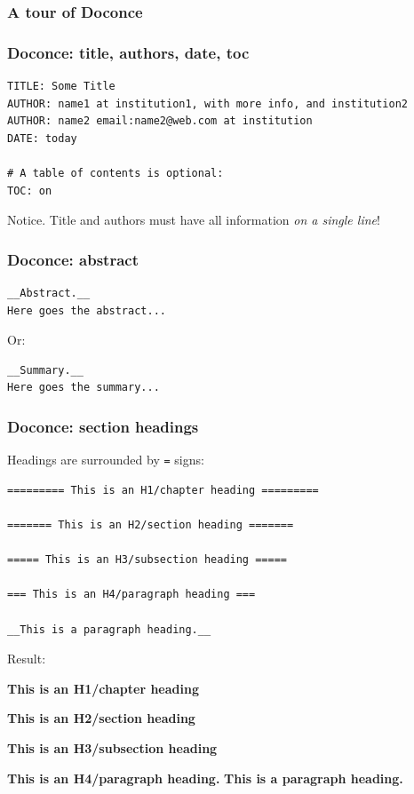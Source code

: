 \documentclass{beamer}
\newenvironment{graybox1admon}[1][]{\begin{block}{#1}}{\end{block}}
\begin{document}
\begin{frame}
\frametitle{A tour of Doconce}

\end{frame}

\begin{frame}
\frametitle{Doconce: title, authors, date, toc}

\begin{Verbatim}[numbers=none,fontsize=\fontsize{9pt}{9pt},baselinestretch=0.95]
TITLE: Some Title
AUTHOR: name1 at institution1, with more info, and institution2
AUTHOR: name2 email:name2@web.com at institution
DATE: today

# A table of contents is optional:
TOC: on
\end{Verbatim}


\begin{graybox1admon}[Notice.]
Title and authors must have all information \emph{on a single line}!
\end{graybox1admon}
\end{frame}

\begin{frame}
\frametitle{Doconce: abstract}

\begin{Verbatim}[numbers=none,fontsize=\fontsize{9pt}{9pt},baselinestretch=0.95]
__Abstract.__
Here goes the abstract...
\end{Verbatim}

Or:
\begin{Verbatim}[numbers=none,fontsize=\fontsize{9pt}{9pt},baselinestretch=0.95]
__Summary.__
Here goes the summary...
\end{Verbatim}
\end{frame}

\begin{frame}
\frametitle{Doconce: section headings}

Headings are surrounded by \Verb!=! signs:
\begin{Verbatim}[numbers=none,fontsize=\fontsize{9pt}{9pt},baselinestretch=0.95]
========= This is an H1/chapter heading =========

======= This is an H2/section heading =======

===== This is an H3/subsection heading =====

=== This is an H4/paragraph heading ===

__This is a paragraph heading.__
\end{Verbatim}

Result:

\noindent\textbf{\huge This is an H1/chapter heading}

\noindent\textbf{\Large This is an H2/section heading}

\noindent\textbf{\large This is an H3/subsection heading}

\noindent\textbf{This is an H4/paragraph heading.}
\noindent\textbf{This is a paragraph heading.}
\end{frame}
\end{document}
